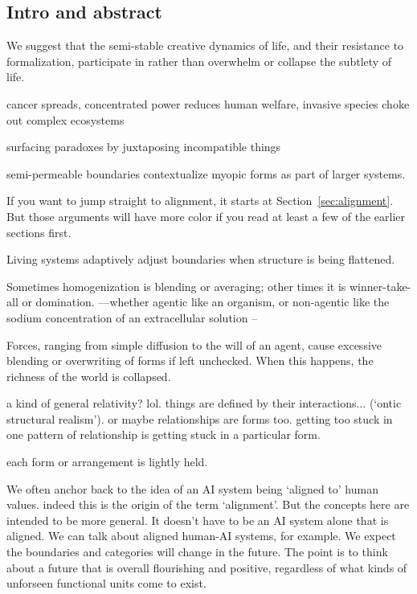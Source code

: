 \subsection{Intro and abstract}


We suggest that the semi-stable creative dynamics of life, and their resistance to formalization, participate in rather than overwhelm or collapse the subtlety of life.

cancer spreads, concentrated power reduces human welfare, invasive species choke out complex ecosystems

surfacing paradoxes by juxtaposing incompatible things

semi-permeable boundaries contextualize myopic forms as part of larger systems. 



If you want to jump straight to alignment, it starts at Section~\ref{sec:alignment}. But those arguments will have more color if you read at least a few of the earlier sections first.

Living systems adaptively adjust boundaries when structure is being flattened. 

Sometimes homogenization is blending or averaging; other times it is winner-take-all or domination. 
---whether agentic like an organism, or non-agentic like the sodium concentration of an extracellular solution --


Forces, ranging from simple diffusion to the will of an agent, cause excessive blending or overwriting of forms if left unchecked. When this happens, the richness of the world is collapsed.


a kind of general relativity? lol. things are defined by their interactions... (`ontic structural realism'). or maybe relationships are forms too. getting too stuck in one pattern of relationship is getting stuck in a particular form. 

each form or arrangement is lightly held. 


We often anchor back to the idea of an AI system being `aligned to' human values. indeed this is the origin of the term `alignment'. But the concepts here are intended to be more general. It doesn't have to be an AI system alone that is aligned. We can talk about aligned human-AI systems, for example. We expect the boundaries and categories will change in the future. The point is to think about a future that is overall flourishing and positive, regardless of what kinds of unforseen functional units come to exist. 

